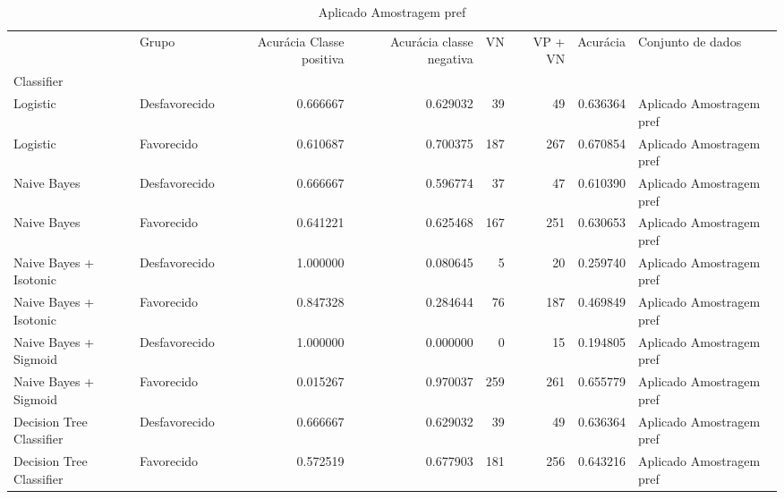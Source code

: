 \begin{table}
\centering
\caption{Aplicado Amostragem pref}
\label{Aplicado Amostragem pref 5}
\begin{tabular}{llrrrrrl}
\toprule
{} &          Grupo &  Acurácia Classe positiva &  Acurácia classe negativa &  VN  &  VP + VN  &  Acurácia &         Conjunto de dados \\
Classifier               &                &                           &                           &      &           &           &                           \\
\midrule
Logistic                 &  Desfavorecido &                  0.666667 &                  0.629032 &   39 &        49 &  0.636364 &  Aplicado Amostragem pref \\
Logistic                 &     Favorecido &                  0.610687 &                  0.700375 &  187 &       267 &  0.670854 &  Aplicado Amostragem pref \\
Naive Bayes              &  Desfavorecido &                  0.666667 &                  0.596774 &   37 &        47 &  0.610390 &  Aplicado Amostragem pref \\
Naive Bayes              &     Favorecido &                  0.641221 &                  0.625468 &  167 &       251 &  0.630653 &  Aplicado Amostragem pref \\
Naive Bayes + Isotonic   &  Desfavorecido &                  1.000000 &                  0.080645 &    5 &        20 &  0.259740 &  Aplicado Amostragem pref \\
Naive Bayes + Isotonic   &     Favorecido &                  0.847328 &                  0.284644 &   76 &       187 &  0.469849 &  Aplicado Amostragem pref \\
Naive Bayes + Sigmoid    &  Desfavorecido &                  1.000000 &                  0.000000 &    0 &        15 &  0.194805 &  Aplicado Amostragem pref \\
Naive Bayes + Sigmoid    &     Favorecido &                  0.015267 &                  0.970037 &  259 &       261 &  0.655779 &  Aplicado Amostragem pref \\
Decision Tree Classifier &  Desfavorecido &                  0.666667 &                  0.629032 &   39 &        49 &  0.636364 &  Aplicado Amostragem pref \\
Decision Tree Classifier &     Favorecido &                  0.572519 &                  0.677903 &  181 &       256 &  0.643216 &  Aplicado Amostragem pref \\
\bottomrule
\end{tabular}
\end{table}
